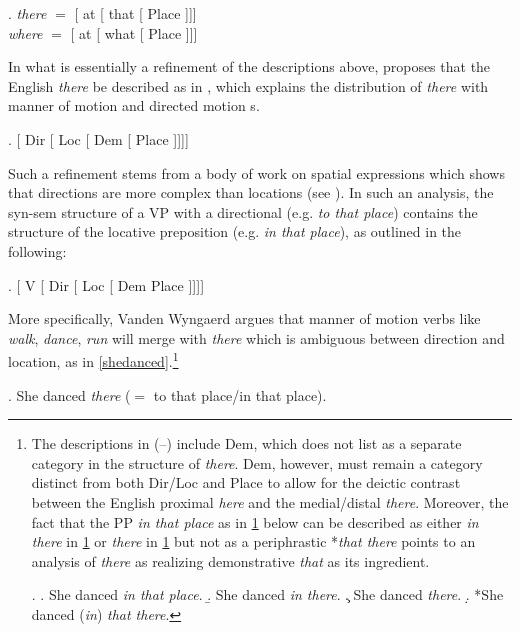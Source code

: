 \ex. \label{Kayne}
\textit{there} $=$ [ at [ that [ Place ]]]\\
\textit{where} $=$ [ at [ what [ Place ]]]
 
\noindent In what is essentially a refinement of the descriptions above, \cite{GVW-Olinco} proposes that the English \textit{there} be described as in \Next, which explains the distribution of \textit{there} with manner of motion and directed motion s.

\ex. [ Dir [ Loc [ Dem [ Place ]]]]\label{dembeforeplace}

Such a refinement stems from a body of work on spatial expressions which shows that directions are more complex than locations (see \citealt{Koopman2000,Kracht2002,Zwarts2005,Cinque2010,DenDikken2010,Svenonius2010,Pantcheva2011}). In such an analysis, the syn-sem structure of a VP with a directional  (e.g. \textit{to that place}) contains the structure of the locative preposition (e.g. \textit{in that place}), as outlined in the following:

\ex.\label{dir-loc} [ V [ Dir [ Loc [ Dem Place ]]]]

\noindent More specifically, Vanden Wyngaerd argues that manner of motion verbs like \textit{walk}, \textit{dance}, \textit{run} will merge with \textit{there} which is ambiguous between direction and location, as in \ref{shedanced}.\footnote{The descriptions in (--) include Dem, which \cite{GVW-Olinco} does not list as a separate category in the structure of \textit{there}. Dem, however, must remain a category distinct from both Dir/Loc and Place to allow for the deictic contrast between the English proximal \textit{here} and the medial/distal \textit{there}. Moreover,  the fact that the PP \textit{in that place} as in \ref{itp} below can be described as either \textit{in there}  in \ref{it} or \textit{there} in \ref{solothere} but not as a periphrastic *\textit{that there} points to an analysis of \textit{there} as realizing demonstrative \textit{that} as its ingredient.

\noindent\parbox{\linguexfootnotewidth}{\ex. 
\a. She danced \textit{in that place}.\label{itp}
\b. She danced \textit{in there}.\label{it}
\c. She danced \textit{there}.\label{solothere}
\d. *She danced (\textit{in}) \textit{that there}.

}}%


\ex. She danced \textit{there} ($=$ to that place/in that place).\label{shedanced}

